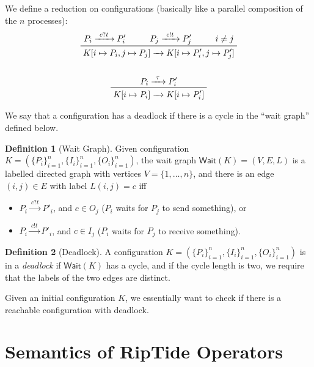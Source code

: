 \documentclass{article}
\theoremstyle{definition}
\newtheorem{definition}{Definition}
\newcommand{\waitgraph}[0]{\textsf{Wait}}
\newcommand{\trans}[1]{\xrightarrow{\ #1\ }}
\begin{document}
We define a reduction on configurations (basically like a parallel composition of the $n$ processes):
\begin{gather*}
    \begin{prftree}
        {P_i \trans{c?t} P'_i}
        {\qquad P_j \trans{c!t} P'_j}
        {\qquad i \ne j}
        {K[i \mapsto P_i, j \mapsto P_j] \trans{} K[i \mapsto P'_i, j \mapsto P'_j]}
    \end{prftree} \\ \\
    \begin{prftree}
        {P_i \trans{\tau} P'_i}
        {K[i \mapsto P_i] \trans{} K[i \mapsto P'_i]}
    \end{prftree}
\end{gather*}

We say that a configuration has a deadlock if there is a cycle in the ``wait graph'' defined below.
\begin{definition}[Wait Graph]
    Given configuration $K = (\{ P_i \}^n_{i = 1}, \{ I_i \}^n_{i = 1}, \{ O_i \}^n_{i = 1})$, the wait graph $\waitgraph(K) = (V, E, L)$ is a labelled directed graph with vertices $V = \{ 1, \dots, n \}$, and there is an edge $(i, j) \in E$ with label $L(i, j) = c$ iff
    \begin{itemize}
        \item $P_i \trans{c?t} P'_i$, and $c \in O_j$ ($P_i$ waits for $P_j$ to send something), or
        \item $P_i \trans{c!t} P'_i$, and $c \in I_j$ ($P_i$ waits for $P_j$ to receive something).
    \end{itemize}
\end{definition}

\begin{definition}[Deadlock]
    A configuration $K = (\{ P_i \}^n_{i = 1}, \{ I_i \}^n_{i = 1}, \{ O_i \}^n_{i = 1})$ is in a \emph{deadlock} if $\waitgraph(K)$ has a cycle, and if the cycle length is two, we require that the labels of the two edges are distinct.
\end{definition}

Given an initial configuration $K$, we essentially want to check if there is a reachable configuration with deadlock.

\section{Semantics of RipTide Operators}
\end{document}
